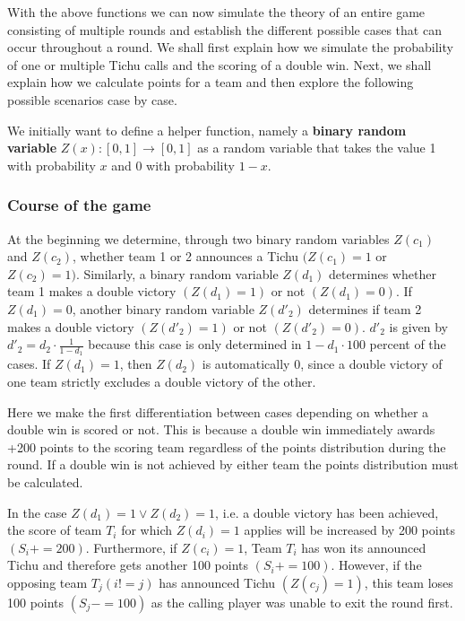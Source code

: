 With the above functions we can now simulate the theory of an entire game consisting of multiple rounds and establish the different possible cases that can occur throughout a round. We shall first explain how we simulate the probability of one or multiple Tichu calls and the scoring of a double win. Next, we shall explain how we calculate points for a team and then explore the following possible scenarios case by case.

\begin{definition}

We initially want to define a helper function, namely a \textbf{binary random variable} $Z(x): [0,1] \to [0,1]$ as a random variable that takes the value 1 with probability $x$ and $0$ with probability $1-x$.

\end{definition}

\subsubsection{Course of the game}
At the beginning we determine, through two binary random variables $Z(c_1)$ and $Z(c_2)$, whether team 1 or 2 announces a Tichu $(Z(c_1) = 1$ or $Z(c_2) = 1)$. Similarly, a binary random variable $Z(d_1)$ determines whether team 1 makes a double victory $(Z(d_1) = 1)$ or not $(Z(d_1) = 0)$. If $Z(d_1) = 0$, another binary random variable $Z(d'_2)$ determines if team 2 makes a double victory $(Z(d'_2) = 1)$ or not $(Z(d'_2) = 0)$. $d'_2$ is given by $d'_2 =d_2\cdot\frac{1}{1-d_1}$ because this case is only determined in $1-d_1\cdot 100$ percent of the cases. If $Z(d_1) = 1$, then $Z(d_2)$ is automatically 0, since a double victory of one team strictly excludes a double victory of the other.

Here we make the first differentiation between cases depending on whether a double win is scored or not. This is because a double win immediately awards +200 points to the scoring team regardless of the points distribution during the round. If a double win is not achieved by either team the points distribution must be calculated.

In the case $Z(d_1) = 1 \lor Z(d_2) = 1$, i.e. a double victory has been achieved, the score of team $T_i$ for which $Z(d_i) = 1$ applies will be increased by 200 points $(S_i += 200)$. Furthermore, if $Z(c_i) = 1$, Team $T_i$ has won its announced Tichu and therefore gets another 100 points $(S_i += 100)$. However, if the opposing team $T_j (i != j)$ has announced Tichu $(Z(c_j) = 1)$, this team loses 100 points $(S_j -= 100)$ as the calling player was unable to exit the round first.

